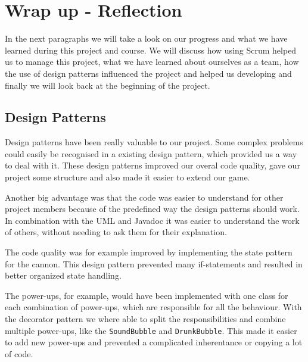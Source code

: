 \documentclass[a4paper]{article}
\begin{document}


\clearpage
\section{Wrap up - Reflection}

In the next paragraphs we will take a look on our progress and what we have learned during this project and course. We will discuss how using Scrum helped us to manage this project, what we have learned about ourselves as a team, how the use of design patterns influenced the project and helped us developing and finally we will look back at the beginning of the project.

\subsection{Design Patterns}
Design patterns have been really valuable to our project. Some complex problems could easily be recognised in a existing design pattern, which provided us a way to deal with it. These design patterns improved our overal code quality, gave our project some structure and also made it easier to extend our game.

Another big advantage was that the code was easier to understand for other project members because of the predefined way the design patterns should work. In combination with the UML and Javadoc it was easier to understand the work of others, without needing to ask them for their explanation.

The code quality was for example improved by implementing the state pattern for the cannon. This design pattern prevented many if-statements and resulted in better organized state handling.

The power-ups, for example, would have been implemented with one class for each combination of power-ups, which are responsible for all the behaviour. With the decorator pattern we where able to split the responsibilities and combine multiple power-ups, like the \texttt{SoundBubble} and \texttt{DrunkBubble}. This made it easier to add new power-ups and prevented a complicated inherentance or copying a lot of code.
\end{document}

